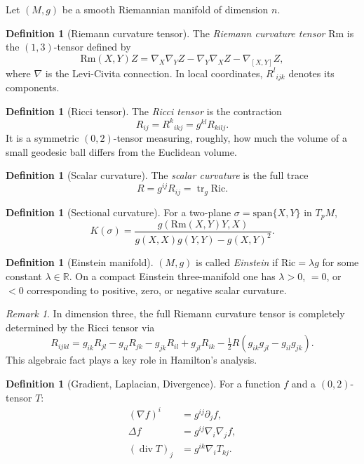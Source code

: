 \documentclass[12pt,a4paper]{amsart}
\theoremstyle{definition}
\newtheorem{definition}[theorem]{Definition}
\theoremstyle{remark}
\newtheorem{remark}[theorem]{Remark}
\newcommand{\R}{\mathbb{R}}
\newcommand{\Ric}{\mathrm{Ric}}
\newcommand{\Rm}{\mathrm{Rm}}
\DeclareMathOperator{\tr}{tr}
\DeclareMathOperator{\divop}{div}
\begin{document}
Let $(M,g)$ be a smooth Riemannian manifold of dimension $n$.

\begin{definition}[Riemann curvature tensor]
The \emph{Riemann curvature tensor} $\Rm$ is the $(1,3)$-tensor defined by
\[
  \Rm(X,Y)Z = \nabla_X\nabla_Y Z - \nabla_Y\nabla_X Z - \nabla_{[X,Y]}Z,
\]
where $\nabla$ is the Levi-Civita connection.  In local coordinates,
$R^l{}_{ijk}$ denotes its components.
\end{definition}

\begin{definition}[Ricci tensor]
The \emph{Ricci tensor} is the contraction
\[
  R_{ij} = R^k{}_{ikj} = g^{kl}R_{kilj}.
\]
It is a symmetric $(0,2)$-tensor measuring, roughly, how much the volume of a
small geodesic ball differs from the Euclidean volume.
\end{definition}

\begin{definition}[Scalar curvature]
The \emph{scalar curvature} is the full trace
\[
  R = g^{ij}R_{ij} = \tr_g \Ric.
\]
\end{definition}

\begin{definition}[Sectional curvature]
For a two-plane $\sigma = \mathrm{span}\{X,Y\}$ in $T_pM$,
\[
  K(\sigma) = \frac{g(\Rm(X,Y)Y,X)}{g(X,X)g(Y,Y)-g(X,Y)^2}.
\]
\end{definition}

\begin{definition}[Einstein manifold]
$(M,g)$ is called \emph{Einstein} if $\Ric = \lambda g$ for some constant
$\lambda \in \R$.  On a compact Einstein three-manifold one has $\lambda > 0$,
$= 0$, or $< 0$ corresponding to positive, zero, or negative scalar curvature.
\end{definition}

\begin{remark}
In dimension three, the full Riemann curvature tensor is completely determined
by the Ricci tensor via
\[
  R_{ijkl} = g_{ik}R_{jl} - g_{il}R_{jk} - g_{jk}R_{il} + g_{jl}R_{ik}
             - \tfrac{1}{2}R(g_{ik}g_{jl} - g_{il}g_{jk}).
\]
This algebraic fact plays a key role in Hamilton's analysis.
\end{remark}

\begin{definition}[Gradient, Laplacian, Divergence]
For a function $f$ and a $(0,2)$-tensor $T$:
\begin{align*}
  (\nabla f)^i &= g^{ij}\partial_j f, \\
  \Delta f &= g^{ij}\nabla_i\nabla_j f, \\
  (\divop T)_j &= g^{ik}\nabla_i T_{kj}.
\end{align*}
\end{definition}
\end{document}
